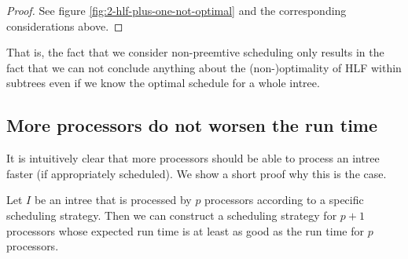 \begin{proof}
  See figure \ref{fig:2-hlf-plus-one-not-optimal} and the corresponding considerations above.
\end{proof}

That is, the fact that we consider non-preemtive scheduling only results in the fact that we can not conclude anything about the (non-)optimality of HLF within subtrees even if we know the optimal schedule for a whole intree.

\subsection{More processors do not worsen the run time}
\label{sec:properties-more-processors-are-better}

It is intuitively clear that more processors should be able to process an intree faster (if appropriately scheduled). We show a short proof why this is the case.

\begin{theorem}
  Let $I$ be an intree that is processed by $p$ processors according to a specific scheduling strategy. Then we can construct a scheduling strategy for $p+1$ processors whose expected run time is at least as good as the run time for $p$ processors.
\end{theorem}

